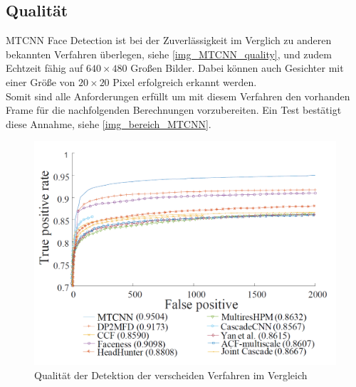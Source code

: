 \subsection{Qualität}
MTCNN Face Detection ist bei der Zuverlässigkeit im Verglich zu anderen bekannten Verfahren überlegen, siehe \autoref{img_MTCNN_quality}, und zudem Echtzeit fähig auf $640\times 480$ Großen Bilder. Dabei können auch Gesichter mit einer Größe von $20\times 20$ Pixel erfolgreich erkannt werden.\\
Somit sind alle Anforderungen erfüllt um mit diesem Verfahren den vorhanden Frame für die nachfolgenden Berechnungen vorzubereiten. Ein Test bestätigt diese Annahme, siehe \autoref{img_bereich_MTCNN}.
\begin{figure}
	\centering
	\includegraphics[width=0.7\linewidth]{img/MTCNN_quality}
	\caption{Qualität der Detektion der verscheiden Verfahren im Vergleich \cite{MTCCN}}
	\label{img_MTCNN_quality}
\end{figure}
